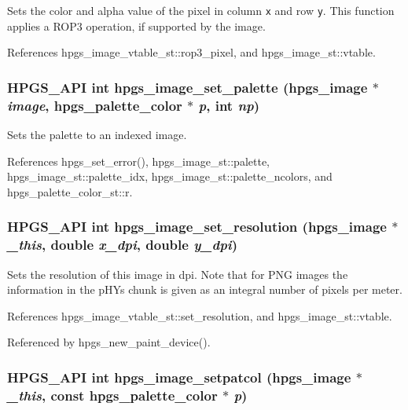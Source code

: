 Sets the color and alpha value of the pixel in column {\tt x} and row {\tt y}. This function applies a ROP3 operation, if supported by the image. 

References hpgs\_\-image\_\-vtable\_\-st::rop3\_\-pixel, and hpgs\_\-image\_\-st::vtable.
\subsubsection[hpgs\_\-image\_\-set\_\-palette]{\setlength{\rightskip}{0pt plus 5cm}HPGS\_\-API int hpgs\_\-image\_\-set\_\-palette ({\bf hpgs\_\-image} $\ast$ {\em image}, \/  {\bf hpgs\_\-palette\_\-color} $\ast$ {\em p}, \/  int {\em np})}\label{group__image_gccce2a8027854c1898034302d33b1471}


Sets the palette to an indexed image. 

References hpgs\_\-set\_\-error(), hpgs\_\-image\_\-st::palette, hpgs\_\-image\_\-st::palette\_\-idx, hpgs\_\-image\_\-st::palette\_\-ncolors, and hpgs\_\-palette\_\-color\_\-st::r.
\subsubsection[hpgs\_\-image\_\-set\_\-resolution]{\setlength{\rightskip}{0pt plus 5cm}HPGS\_\-API int hpgs\_\-image\_\-set\_\-resolution ({\bf hpgs\_\-image} $\ast$ {\em \_\-this}, \/  double {\em x\_\-dpi}, \/  double {\em y\_\-dpi})}\label{group__image_g70f2f4f5bdec053d29e89991d97db67a}


Sets the resolution of this image in dpi. Note that for PNG images the information in the pHYs chunk is given as an integral number of pixels per meter. 

References hpgs\_\-image\_\-vtable\_\-st::set\_\-resolution, and hpgs\_\-image\_\-st::vtable.

Referenced by hpgs\_\-new\_\-paint\_\-device().
\subsubsection[hpgs\_\-image\_\-setpatcol]{\setlength{\rightskip}{0pt plus 5cm}HPGS\_\-API int hpgs\_\-image\_\-setpatcol ({\bf hpgs\_\-image} $\ast$ {\em \_\-this}, \/  const {\bf hpgs\_\-palette\_\-color} $\ast$ {\em p})}\label{group__image_g3d1709fd4b96a366af437eea44ddf0bd}


